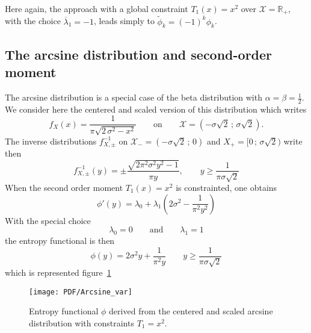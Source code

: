 \documentclass[english,onecolumn]{elsarticle}
\def\Rset{\mathbb{R}}
\def\X{\mathcal{X}}
\begin{document}
Here again,  the approach  with a global  constraint $T_1(x)  = x^2$ over  $\X =
\Rset_+$,  with  the  choice  $\overline{\lambda}_1  = -  1$,  leads  simply  to
$\widetilde{\phi}_k = (-1)^k \phi_k$.



\subsection{The arcsine distribution and second-order moment}
\label{subsec:ArcsineSecondOrder}

The arcsine distribution is a special case of the beta distribution with $\alpha
= \beta  = \frac12$. We  consider here the  centered and scaled version  of this
distribution which writes
%
\[
f_X(x) = \frac{1}{\pi \sqrt{2 \, \sigma^2 - x^2}} \qquad \mbox{on} \qquad \X =
(-\sigma \sqrt2 \, ; \, \sigma \sqrt2).
\]
%
The inverse  distributions $f_{X,\pm}^{-1}$ on $\X_-  = (-\sigma \sqrt2  \, ; \,
0)$ and $X_+ = [0 \, ; \, \sigma \sqrt2)$ write then
%
\[
f_{X,\pm}^{-1}(y) = \pm \frac{\sqrt{2 \pi^2 \sigma^2 y^2 - 1}}{\pi y}, \qquad y
\ge \frac{1}{\pi \sigma \sqrt2}
\]
%
When the second order moment $T_1(x) = x^2$ is constrainted, one obtains
%
\[
\phi'(y) = \lambda_0 + \lambda_1 \left( 2 \sigma^2 - \frac{1}{\pi^2 y^2} \right)
\]
%
With the special choice
%
\[
\lambda_0 = 0 \qquad \mbox{and} \qquad \lambda_1 = 1
\]
%
the entropy functional is then
%
\[
\phi(y) = 2 \sigma^2 y +\frac{1}{\pi^2 y} \qquad y \ge \frac{1}{\pi \sigma \sqrt2}
\]
%
which is represented figure~\ref{fig:Entropy-arcsin-var}
%
\begin{figure}[htbp]
\centerline{\texttt{[image: PDF/Arcsine\_var]}}
%
\caption{Entropy functional $\phi$ derived  from the centered and scaled arcsine
  distribution with constraints $T_1 = x^2$.}
\label{fig:Entropy-arcsin-var}
\end{figure}
%

\end{document}
